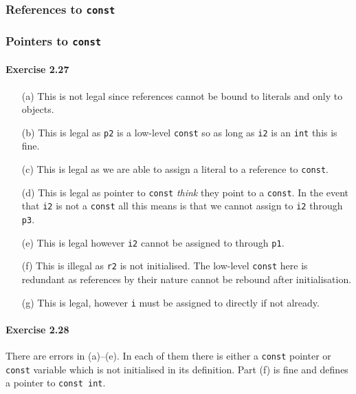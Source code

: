 \subsubsection{References to \texttt{const}}

\subsubsection{Pointers to \texttt{const}}

\paragraph{Exercise 2.27}
\begin{itemize}
	\item [(a)]
		This is not legal since references cannot be bound to literals and only to objects.
	\item [(b)]
		This is legal as \texttt{p2} is a low-level \texttt{const} so as long as \texttt{i2} is an \texttt{int} this is fine.
	\item [(c)]
		This is legal as we are able to assign a literal to a reference to \texttt{const}.
	\item [(d)]
		This is legal as pointer to \texttt{const} \textit{think} they point to a \texttt{const}. In the event that \texttt{i2} is not a \texttt{const} all this means is that we cannot assign to \texttt{i2} through \texttt{p3}.
	\item [(e)]
		This is legal however \texttt{i2} cannot be assigned to through \texttt{p1}.
	\item [(f)]
		This is illegal as \texttt{r2} is not initialised. The low-level \texttt{const} here is redundant as references by their nature cannot be rebound after initialisation.
	\item [(g)]
		This is legal, however \texttt{i} must be assigned to directly if not already.
\end{itemize}

\paragraph{Exercise 2.28}
There are errors in (a)--(e). In each of them there is either a \texttt{const} pointer or \texttt{const} variable which is not initialised in its definition. Part (f) is fine and defines a pointer to \texttt{const int}.


